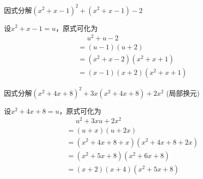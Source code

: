 \documentclass[windows,csize4,answers]{BHCexam}
\begin{document}
\begin{groups}

    \begin{questions}[]
        \question[5]因式分解$(x^2+x-1)^2+(x^2+x-1)-2$
        \begin{solution}{0.5cm}
            \methodonly 设$x^2+x-1=u$，原式可化为
            \[
                \begin{aligned}
                     & \phantom{=}u^2+u-2   \\
                     & =(u-1)(u+2)          \\
                     & =(x^2+x-2)(x^2+x+1)  \\
                     & =(x-1)(x+2)(x^2+x+1)
                \end{aligned}
            \]
        \end{solution}
        \vspace{3.5cm}

        \question[5]因式分解$(x^2+4x+8)^2+3x(x^2+4x+8)+2x^2$ (局部换元)
        \begin{solution}{0.5cm}
            \methodonly 设$x^2+4x+8=u$，原式可化为
            \[
                \begin{aligned}
                     & \phantom{=}u^2+3xu+2x^2    \\
                     & =(u+x)(u+2x)               \\
                     & =(x^2+4x+8+x)(x^2+4x+8+2x) \\
                     & =(x^2+5x+8)(x^2+6x+8)      \\
                     & = (x+2)(x+4)(x^2+5x+8)
                \end{aligned}
            \]
        \end{solution}
        \vspace{3.5cm}


\end{questions}
\end{groups}
\end{document}
